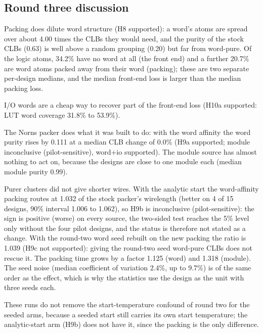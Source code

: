 \subsection{Round three discussion}

\label{sec:r3-discussion}



Packing does dilute word structure (H8 supported): a word's atoms are spread over about 4.00 times the CLBs they would need, and the purity of the stock CLBs (0.63) is well above a random grouping (0.20) but far from word-pure. Of the logic atoms, 34.2\% have no word at all (the front end) and a further 20.7\% are word atoms packed away from their word (packing); these are two separate per-design medians, and the median front-end loss is larger than the median packing loss.

I/O words are a cheap way to recover part of the front-end loss (H10a supported: LUT word coverage 31.8\% to 53.9\%).

The Norns packer does what it was built to do: with the word affinity the word purity rises by 0.111 at a median CLB change of 0.0\% (H9a supported; module inconclusive (pilot-sensitive), word+io supported). The module source has almost nothing to act on, because the designs are close to one module each (median module purity 0.99).

Purer clusters did not give shorter wires. With the analytic start the word-affinity packing routes at 1.032 of the stock packer's wirelength (better on 4 of 15 designs, 90\% interval 1.006 to 1.062), so H9b is inconclusive (pilot-sensitive): the sign is positive (worse) on every source, the two-sided test reaches the 5\% level only without the four pilot designs, and the status is therefore not stated as a change. With the round-two word seed rebuilt on the new packing the ratio is 1.039 (H9c not supported): giving the round-two seed word-pure CLBs does not rescue it. The packing time grows by a factor 1.125 (word) and 1.318 (module). The seed noise (median coefficient of variation 2.4\%, up to 9.7\%) is of the same order as the effect, which is why the statistics use the design as the unit with three seeds each.

These runs do not remove the start-temperature confound of round two for the seeded arms, because a seeded start still carries its own start temperature; the analytic-start arm (H9b) does not have it, since the packing is the only difference.

